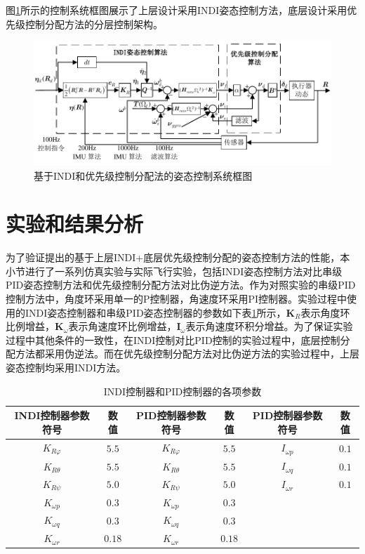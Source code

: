 图\ref{实际框图}所示的控制系统框图展示了上层设计采用INDI姿态控制方法，底层设计采用优先级控制分配方法的分层控制架构。
\begin{figure}[htbp]
	\centering
	\begin{minipage}[c]{1\textwidth}
		\centering
		\includegraphics[scale=1]{Fig/实际框图.pdf}
		\caption{\label{实际框图}基于INDI和优先级控制分配法的姿态控制系统框图}
	\end{minipage}%
\end{figure}

\section{实验和结果分析}

为了验证提出的基于上层INDI+底层优先级控制分配的姿态控制方法的性能，本小节进行了一系列仿真实验与实际飞行实验，包括INDI姿态控制方法对比串级PID姿态控制方法和优先级控制分配方法对比伪逆方法。作为对照实验的串级PID控制方法中，角度环采用单一的P控制器，角速度环采用PI控制器。实验过程中使用的INDI姿态控制器和串级PID姿态控制器的参数如下表\ref{Control_parameters}所示，$\boldsymbol{K}_{R}$表示角度环比例增益，$\boldsymbol{K}_{\omega}$表示角速度环比例增益，$\boldsymbol{I}_{\omega}$表示角速度环积分增益。为了保证实验过程中其他条件的一致性，在INDI控制对比PID控制的实验过程中，底层控制分配方法都采用伪逆法。而在优先级控制分配方法对比伪逆方法的实验过程中，上层姿态控制均采用INDI方法。
\begin{table}
	\caption{\label{Control_parameters}INDI控制器和PID控制器的各项参数}
	\centering
	\small 
	\begin{tabular}{cccccc}
		\hline 
		INDI控制器参数符号 & 数值 & PID控制器参数符号 & 数值 & PID控制器参数符号 & 数值 \tabularnewline
		\hline 
		$K_{R\varphi}$ & $5.5$ & $K_{R\varphi}$ & $5.5 $& $I_{\omega p}$ & $0.1$ \tabularnewline
		$K_{R\theta}$   & $5.5$ & $K_{R\theta}$   & $5.5$& $I_{\omega q}$   & $0.1$ \tabularnewline
        $K_{R\psi}$   & $5.0$ & $K_{R\psi}$   & $5.0$& $I_{\omega r}$   & $0.1$ \tabularnewline
        $K_{\omega p}$   & $0.3$ & $K_{\omega p}$   & $0.3$ \tabularnewline
        $K_{\omega q}$   & $0.3$ & $K_{\omega q}$   & $0.3$ \tabularnewline
        $K_{\omega r}$   & $0.18$ & $K_{\omega r}$   & $0.18$ \tabularnewline
		\hline 
	\end{tabular}
\end{table}

